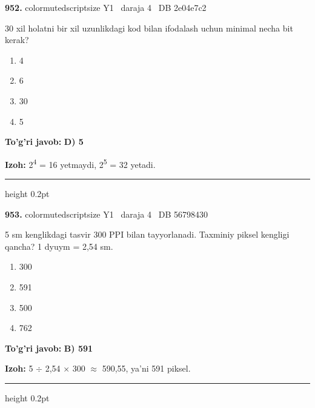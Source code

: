 \documentclass[10pt,a4paper,oneside]{article}
\begin{document}
\noindent\textbf{\color{ink}952.}  {color{muted}scriptsize Y1 \textbullet\ daraja 4 \textbullet\ DB 2e04e7c2}
\par
30 xil holatni bir xil uzunlikdagi kod bilan ifodalash uchun minimal necha bit kerak?
\begin{enumerate}[label=\Alph*),leftmargin=9mm]
\item 4
\item 6
\item 30
\item 5
\end{enumerate}
\begin{tcolorbox}[enhanced,breakable,colback=teal!4,colframe=teal!50!black,boxrule=0.5pt,arc=1.1mm,left=3mm,right=3mm,top=1.7mm,bottom=1.7mm,before skip=2mm,after skip=2mm]
\textbf{\color{teal}To'g'ri javob:} \textbf{D) 5}
\par\smallskip
\textbf{Izoh:} 2\textsuperscript{4} = 16 yetmaydi, 2\textsuperscript{5} = 32 yetadi.
\end{tcolorbox}
\vspace{2mm}\hrule height 0.2pt \vspace{3mm}

\noindent\textbf{\color{ink}953.}  {color{muted}scriptsize Y1 \textbullet\ daraja 4 \textbullet\ DB 56798430}
\par
5 sm kenglikdagi tasvir 300 PPI bilan tayyorlanadi. Taxminiy piksel kengligi qancha? 1 dyuym = 2,54 sm.
\begin{enumerate}[label=\Alph*),leftmargin=9mm]
\item 300
\item 591
\item 500
\item 762
\end{enumerate}
\begin{tcolorbox}[enhanced,breakable,colback=teal!4,colframe=teal!50!black,boxrule=0.5pt,arc=1.1mm,left=3mm,right=3mm,top=1.7mm,bottom=1.7mm,before skip=2mm,after skip=2mm]
\textbf{\color{teal}To'g'ri javob:} \textbf{B) 591}
\par\smallskip
\textbf{Izoh:} 5 \ensuremath{\div} 2,54 \ensuremath{\times} 300 \ensuremath{\approx} 590,55, ya'ni 591 piksel.
\end{tcolorbox}
\vspace{2mm}\hrule height 0.2pt \vspace{3mm}
\end{document}
